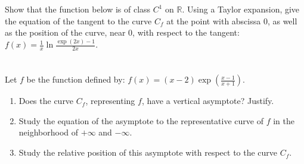 \documentclass[12pt]{article}
\begin{document}
\newpage

\begin{answerbox}


\end{answerbox}

\newpage

\section{}
Show that the function below is of class $C^1$ on $\mathbb{R}$. Using a Taylor expansion, give the equation of the tangent to the curve $C_f$ at the point with abscissa 0, as well as the position of the curve, near 0, with respect to the tangent:
$f(x) = \frac{1}{x}\ln\frac{\exp(2x) - 1}{2x}$.

\newpage

\begin{answerbox}


\end{answerbox}

\newpage

\section{}
Let $f$ be the function defined by: $f(x) = (x - 2)\exp\left(\frac{x-1}{x+1}\right)$.
\begin{enumerate}
    \item Does the curve $C_f$, representing $f$, have a vertical asymptote? Justify.
    
    \item Study the equation of the asymptote to the representative curve of $f$ in the neighborhood of $+\infty$ and $-\infty$.
    
    \item Study the relative position of this asymptote with respect to the curve $C_f$.
\end{enumerate}

\newpage

\begin{answerbox}


\end{answerbox}

\end{document}
